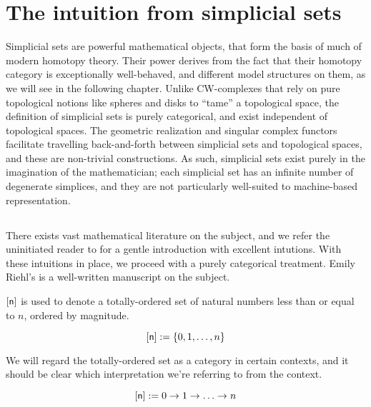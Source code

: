 \documentclass[10pt]{art}
\begin{document}
\section{The intuition from simplicial sets}
Simplicial sets are powerful mathematical objects, that form the basis of much of modern homotopy theory. Their power derives from the fact that their homotopy category is exceptionally well-behaved, and different model structures on them, as we will see in the following chapter. Unlike CW-complexes that rely on pure topological notions like spheres and disks to ``tame'' a topological space, the definition of simplicial sets is purely categorical, and exist independent of topological spaces. The geometric realization and singular complex functors facilitate travelling back-and-forth between simplicial sets and topological spaces, and these are non-trivial constructions. As such, simplicial sets exist purely in the imagination of the mathematician; each simplicial set has an infinite number of degenerate simplices, and they are not particularly well-suited to machine-based representation.

\subsection{\texorpdfstring{\SSet}{The category of simplicial sets}}
There exists vast mathematical literature on the subject, and we refer the uninitiated reader to \cite{Friedman08} for a gentle introduction with excellent intutions. With these intuitions in place, we proceed with a purely categorical treatment. Emily Riehl's \cite{Riehl11} is a well-written manuscript on the subject.

\begin{definition}[\sq{n}]
  $\mathsf{[n]}$ is used to denote a totally-ordered set of natural numbers less than or equal to $n$, ordered by magnitude.

  \begin{equation*}
    \mathsf{[n]} := \{0, 1, \ldots, n\}
  \end{equation*}

  We will regard the totally-ordered set as a category in certain contexts, and it should be clear which interpretation we're referring to from the context.

  \begin{equation*}
    \mathsf{[n]} := 0 \rightarrow 1 \rightarrow \ldots \rightarrow n
  \end{equation*}
\end{definition}
\end{document}
